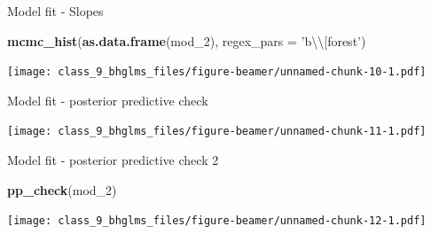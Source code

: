 \documentclass[ignorenonframetext,]{beamer}
\newenvironment{Shaded}{\begin{snugshade}}{\end{snugshade}}
\newcommand{\KeywordTok}[1]{\textcolor[rgb]{0.13,0.29,0.53}{\textbf{#1}}}
\newcommand{\DataTypeTok}[1]{\textcolor[rgb]{0.13,0.29,0.53}{#1}}
\newcommand{\DecValTok}[1]{\textcolor[rgb]{0.00,0.00,0.81}{#1}}
\newcommand{\CharTok}[1]{\textcolor[rgb]{0.31,0.60,0.02}{#1}}
\newcommand{\StringTok}[1]{\textcolor[rgb]{0.31,0.60,0.02}{#1}}
\newcommand{\OperatorTok}[1]{\textcolor[rgb]{0.81,0.36,0.00}{\textbf{#1}}}
\newcommand{\NormalTok}[1]{#1}
\begin{document}
\begin{frame}[fragile]{Model fit - Slopes}

\begin{Shaded}
\begin{Highlighting}[]
\KeywordTok{mcmc_hist}\NormalTok{(}\KeywordTok{as.data.frame}\NormalTok{(mod_}\DecValTok{2}\NormalTok{), }\DataTypeTok{regex_pars =} \StringTok{'b}\CharTok{\textbackslash{}\textbackslash{}}\StringTok{[forest'}\NormalTok{)}
\end{Highlighting}
\end{Shaded}

\texttt{[image: class\_9\_bhglms\_files/figure-beamer/unnamed-chunk-10-1.pdf]}

\end{frame}

\begin{frame}[fragile]{Model fit - posterior predictive check}

\begin{Shaded}
\end{Shaded}

\texttt{[image: class\_9\_bhglms\_files/figure-beamer/unnamed-chunk-11-1.pdf]}

\end{frame}

\begin{frame}[fragile]{Model fit - posterior predictive check 2}

\begin{Shaded}
\begin{Highlighting}[]
\KeywordTok{pp_check}\NormalTok{(mod_}\DecValTok{2}\NormalTok{)}
\end{Highlighting}
\end{Shaded}

\texttt{[image: class\_9\_bhglms\_files/figure-beamer/unnamed-chunk-12-1.pdf]}

\end{frame}
\end{document}
